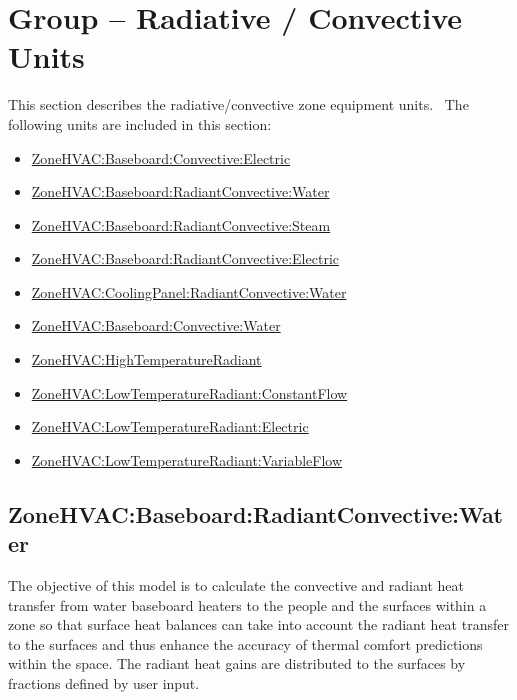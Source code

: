 \section{Group -- Radiative \textbf{/} Convective Units}\label{group-radiative-convective-units}

This section describes the radiative/convective zone equipment units.~ The following units are included in this section:

\begin{itemize}
\item
  \hyperref[zonehvacbaseboardconvectiveelectric]{ZoneHVAC:Baseboard:Convective:Electric}
\item
  \hyperref[zonehvacbaseboardradiantconvectivewater]{ZoneHVAC:Baseboard:RadiantConvective:Water}
\item
  \hyperref[zonehvacbaseboardradiantconvectivesteam]{ZoneHVAC:Baseboard:RadiantConvective:Steam}
\item
  \hyperref[zonehvacbaseboardradiantconvectiveelectric]{ZoneHVAC:Baseboard:RadiantConvective:Electric}
\item
  \hyperref[zonehvaccoolingpanelradiantconvectivewater]{ZoneHVAC:CoolingPanel:RadiantConvective:Water}
\item
  \hyperref[zonehvacbaseboardconvectivewater]{ZoneHVAC:Baseboard:Convective:Water}
\item
  \hyperref[zonehvachightemperatureradiant]{ZoneHVAC:HighTemperatureRadiant}
\item
  \hyperref[zonehvaclowtemperatureradiantconstantflow]{ZoneHVAC:LowTemperatureRadiant:ConstantFlow}
\item
  \hyperref[zonehvaclowtemperatureradiantelectric]{ZoneHVAC:LowTemperatureRadiant:Electric}
\item
  \hyperref[zonehvaclowtemperatureradiantvariableflow]{ZoneHVAC:LowTemperatureRadiant:VariableFlow}
\end{itemize}

\subsection{ZoneHVAC:Baseboard:RadiantConvective:Water}\label{zonehvacbaseboardradiantconvectivewater}

The objective of this model is to calculate the convective and radiant heat transfer from water baseboard heaters to the people and the surfaces within a zone so that surface heat balances can take into account the radiant heat transfer to the surfaces and thus enhance the accuracy of thermal comfort predictions within the space. The radiant heat gains are distributed to the surfaces by fractions defined by user input.

